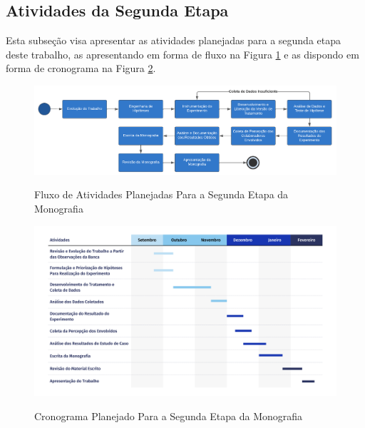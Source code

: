\subsection{Atividades da Segunda Etapa}
\label{cronograma2}

Esta subseção visa apresentar as atividades planejadas para a segunda etapa deste trabalho,
as apresentando em forma de fluxo na Figura \ref{fig:atividades_2} e as dispondo em forma de cronograma na Figura \ref{fig:cronograma_2}.

\newpage

\begin{figure}[h!]
    \caption{Fluxo de Atividades Planejadas Para a Segunda Etapa da Monografia}
    \centering
    \includegraphics[width=.9\linewidth]{figuras/atividades2.png}
    \label{fig:atividades_2}
\end{figure}

\begin{figure}[h!]
    \caption{Cronograma Planejado Para a Segunda Etapa da Monografia}
    \centering
    \includegraphics[width=.9\linewidth]{figuras/cronograma2.png}
    \label{fig:cronograma_2}
\end{figure}


